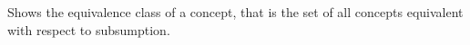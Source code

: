  

Shows the equivalence class of a concept, that is the set of
all concepts equivalent with respect to subsumption.


